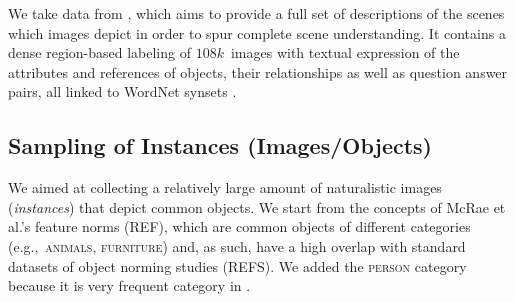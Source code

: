 We take data from \vgenome \cite{krishna2016visualgenome}, which aims to provide a full set of descriptions of the scenes which images depict in order to spur complete scene understanding. 
It contains a dense region-based labeling of $108k$~images with textual expression of the attributes and references of objects, their relationships as well as question answer pairs, all linked to WordNet synsets \cite[see below]{fellbaum1998wordnet}.






\subsection{Sampling of Instances (Images/Objects)}

We aimed at collecting a relatively large amount of naturalistic images (\textit{instances}) that depict common objects. 
We start from the concepts of McRae et al.'s feature norms (REF), which are common objects of different categories (e.g.,~\textsc{animals}, \textsc{furniture}) and, as such, have a high overlap with standard datasets of object norming studies (REFS).
We added the \textsc{person} category because it is very frequent category in \vgenome.

